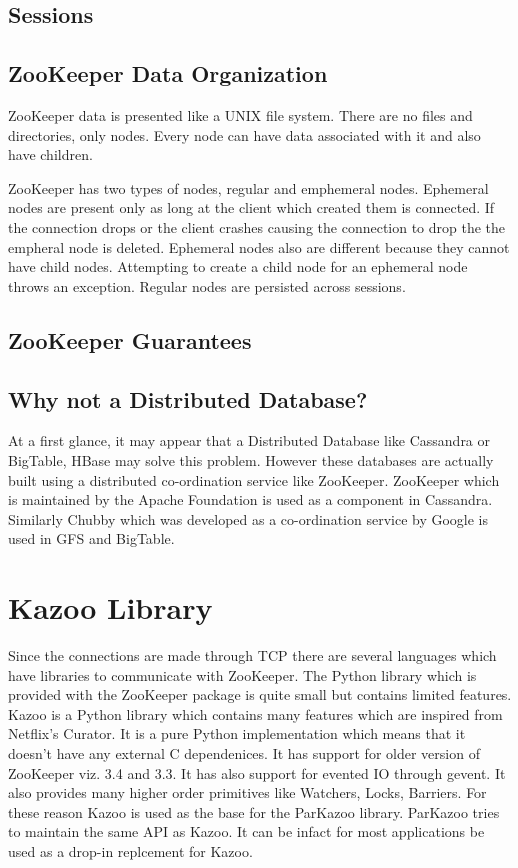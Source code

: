 
\subsection{Sessions}

\subsection{ZooKeeper Data Organization}
ZooKeeper data is presented like a UNIX file system. There are no files and directories, only nodes. Every node can have data associated with it and also have children. 



ZooKeeper has two types of nodes, regular and emphemeral nodes. Ephemeral nodes are present only as long at the client which created them is connected. If the connection drops or the client crashes causing the connection to drop the the empheral node is deleted. Ephemeral nodes also are different because they cannot have child nodes. Attempting to create a child node for an ephemeral node throws an exception. Regular nodes are persisted across sessions.

\subsection{ZooKeeper Guarantees}

\subsection{Why not a Distributed Database?}
At a first glance, it may appear that a Distributed Database like Cassandra or BigTable, HBase may solve this problem. However these databases are actually built using a distributed co-ordination service like ZooKeeper. ZooKeeper which is maintained by the Apache Foundation is used as a component in Cassandra. Similarly Chubby which was developed as a co-ordination service by Google is used in GFS and BigTable.

\section{Kazoo Library}
Since the connections are made through TCP there are several languages which have libraries to communicate with ZooKeeper. The Python library which is provided with the ZooKeeper package is quite small but contains limited features. Kazoo is a Python library which contains many features which are inspired from Netflix's Curator. It is a pure Python implementation which means that it doesn't have any external C dependenices. It has support for older version of ZooKeeper viz. 3.4 and 3.3. It has also support for evented IO through gevent. It also provides many higher order primitives like Watchers, Locks, Barriers. For these reason Kazoo is used as the base for the ParKazoo library. ParKazoo tries to maintain the same API as Kazoo. It can be infact for most applications be used as a drop-in replcement for Kazoo.

